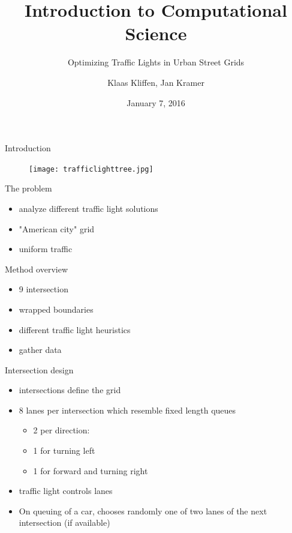\documentclass[11pt]{beamer}
\title{Introduction to Computational Science}
\subtitle{Optimizing Traffic Lights in Urban Street Grids}
\author{Klaas Kliffen, Jan Kramer}
\date{January 7, 2016}
\begin{document}
\maketitle

\begin{frame}{Introduction}
\begin{figure}
\centering
\texttt{[image: trafficlighttree.jpg]}
\end{figure}
\end{frame}

\begin{frame}{The problem}
\begin{itemize}
    \item analyze different traffic light solutions
    \item "American city" grid
    \item uniform traffic
\end{itemize}
\end{frame}

\begin{frame}{Method overview}
\begin{itemize}
    \item 9 intersection
    \item wrapped boundaries
    \item different traffic light heuristics
    \item gather data
\end{itemize}
\end{frame}

\begin{frame}{Intersection design}

\begin{itemize}
 \item intersections define the grid
 \item 8 lanes per intersection which resemble fixed length queues
 \begin{itemize}
  \item 2 per direction:
  \item 1 for turning left
  \item 1 for forward and turning right
 \end{itemize}
 \item traffic light controls lanes
 \item On queuing of a car, chooses randomly one of two lanes of the next intersection (if available)


\end{itemize}
\end{frame}
\end{document}
